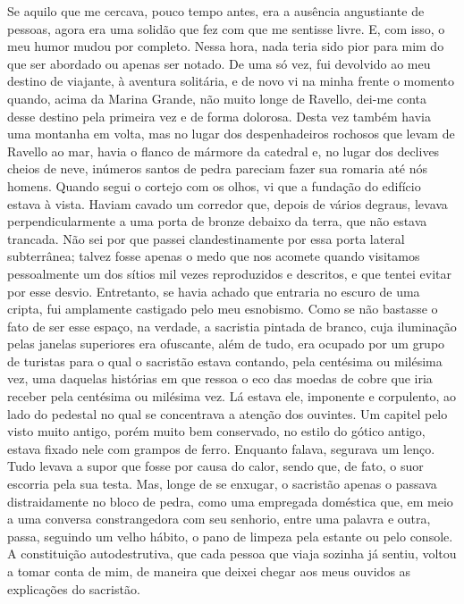 Se aquilo que me cercava, pouco tempo antes, era a ausência angustiante
de pessoas, agora era uma solidão que fez com que me sentisse livre. E,
com isso, o meu humor mudou por completo. Nessa hora, nada teria sido
pior para mim do que ser abordado ou apenas ser notado. De uma só vez,
fui devolvido ao meu destino de viajante, à aventura solitária, e de
novo vi na minha frente o momento quando, acima da Marina Grande, não
muito longe de Ravello, dei-me conta desse destino pela primeira vez e
de forma dolorosa. Desta vez também havia uma montanha em volta, mas no
lugar dos despenhadeiros rochosos que levam de Ravello ao mar, havia o
flanco de mármore da catedral e, no lugar dos declives cheios de neve,
inúmeros santos de pedra pareciam fazer sua romaria até nós homens.
Quando segui o cortejo com os olhos, vi que a fundação do edifício
estava à vista. Haviam cavado um corredor que, depois de vários degraus,
levava perpendicularmente a uma porta de bronze debaixo da terra, que
não estava trancada. Não sei por que passei clandestinamente por essa
porta lateral subterrânea; talvez fosse apenas o medo que nos acomete
quando visitamos pessoalmente um dos sítios mil vezes reproduzidos e
descritos, e que tentei evitar por esse desvio. Entretanto, se havia
achado que entraria no escuro de uma cripta, fui amplamente castigado
pelo meu esnobismo. Como se não bastasse o fato de ser esse espaço, na
verdade, a sacristia pintada de branco, cuja iluminação pelas janelas
superiores era ofuscante, além de tudo, era ocupado por um grupo de
turistas para o qual o sacristão estava contando, pela centésima ou
milésima vez, uma daquelas histórias em que ressoa o eco das moedas de
cobre que iria receber pela centésima ou milésima vez. Lá estava ele,
imponente e corpulento, ao lado do pedestal no qual se concentrava a
atenção dos ouvintes. Um capitel pelo visto muito antigo, porém muito
bem conservado, no estilo do gótico antigo, estava fixado nele com
grampos de ferro. Enquanto falava, segurava um lenço. Tudo levava a
supor que fosse por causa do calor, sendo que, de fato, o suor escorria
pela sua testa. Mas, longe de se enxugar, o sacristão apenas o passava
distraidamente no bloco de pedra, como uma empregada doméstica que, em
meio a uma conversa constrangedora com seu senhorio, entre uma palavra e
outra, passa, seguindo um velho hábito, o pano de limpeza pela estante
ou pelo console. A constituição autodestrutiva, que cada pessoa que viaja
sozinha já sentiu, voltou a tomar conta de mim, de maneira que deixei
chegar aos meus ouvidos as explicações do sacristão.

